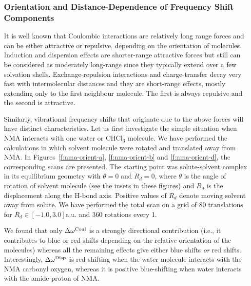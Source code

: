 \documentclass[b5paper,oneside,fleqn,11pt]{book}
\begin{document}
\begin{refsection}
\subsubsection{Orientation and Distance\hyp{}Dependence of Frequency Shift Components\label{s:amide-I-orient}}

It is well known that Coulombic interactions are relatively long range forces
and can be either attractive or repulsive, depending on the orientation
of molecules.
Induction and dispersion effects are shorter\hyp{}range attractive forces but still
can be considered as moderately long\hyp{}range since they typically
extend over a few solvation shells. Exchange\hyp{}repulsion interactions
and charge\hyp{}transfer decay very fast with intermolecular distances
and they are short\hyp{}range effects, mostly extending only to the first
neighbour molecule. The first is always repulsive and the second is attractive.

Similarly, vibrational frequency shifts that originate due to the above
forces will have distinct characteristics. Let us first investigate
the simple situation when NMA interacts with one water or CHCl$_3$ molecule.
We have performed the calculations in which solvent molecule were rotated
and translated away from NMA. In Figures~\ref{f:nma-orient-a}, \ref{f:nma-orient-b}
and \ref{f:nma-orient-d}, the corresponding scans are presented.
The starting point was solute\hyp{}solvent complex in its equilibrium geometry
with $\theta=0$ and $R_d=0$, where $\theta$ is the angle of rotation of solvent
molecule (see the insets in these figures) and $R_d$ is the displacement along the H-bond axis.
Positive values of $R_d$ denote moving solvent away from solute. We have performed
the total scan on a grid of 80 translations for $R_d\in [-1.0,3.0]\text{a.u.}$ 
and 360 rotations every 1\textdegree.

We found that only $\Delta\omega^{\rm Coul}$ is a strongly directional
contribution (i.e., it contributes to blue or red shifts depending on the
relative orientation of the molecules) whereas all the remaining effects
give either blue shifts \emph{or} red shifts. Interestingly, $\Delta\omega^{\rm Disp}$
is red\hyp{}shifting when
the water molecule interacts with the NMA carbonyl oxygen,
whereas it is positive blue-shifting when water interacts with
the amide proton of NMA.


\end{refsection}
\end{document}
